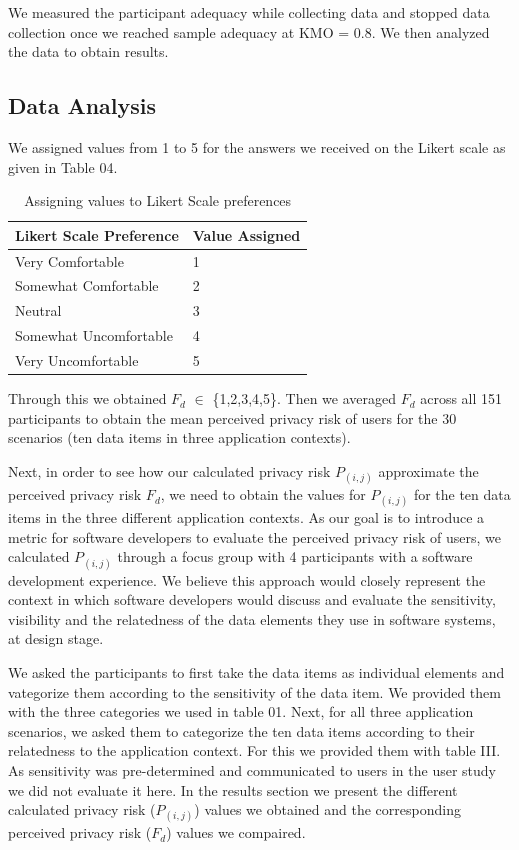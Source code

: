 \documentclass[conference]{IEEEtran}
\begin{document}
We measured the participant adequacy while collecting data and stopped data collection once we reached sample adequacy at KMO = 0.8. We then analyzed the data to obtain results.

\subsection {Data Analysis}

We assigned values from 1 to 5 for the answers we received on the Likert scale as given in Table 04.

\begin{center}
\begin{table}[htbp]
\caption{Assigning values to Likert Scale preferences}
\begin{center}
\begin{tabular}{|l|l|} 
\hline
Likert Scale Preference & Value Assigned \\
\hline
Very Comfortable & 1\\
\hline
Somewhat Comfortable& 2 \\
\hline
Neutral & 3  \\
\hline
Somewhat Uncomfortable & 4 \\
\hline
Very Uncomfortable & 5 \\
\hline
\end{tabular}
\end{center}
\end{table}
\end{center}

Through this we obtained $F_d$ $\in$ \{1,2,3,4,5\}. Then we averaged $F_d$ across all 151 participants to obtain the mean perceived privacy risk of users for the 30 scenarios (ten data items in three application contexts).

Next, in order to see how our calculated privacy risk $P_(i,j)$ approximate the perceived privacy risk $F_d$, we need to obtain the values for $P_(i,j)$ for the ten data items in the three different application contexts. As our goal is to introduce a metric for software developers to evaluate the perceived privacy risk of users, we calculated $P_(i,j)$ through a focus group with 4 participants with a software development experience. We believe this approach would closely represent the context in which software developers would discuss and evaluate the sensitivity, visibility and the relatedness of the data elements they use in software systems, at design stage. 

We asked the participants to first take the data items as individual elements and vategorize them according to the sensitivity of the data item. We provided them with the three categories we used in table 01. Next, for all three application scenarios, we asked them to categorize the ten data items according to their relatedness to the application context. For this we provided them with table III. As sensitivity was pre-determined and communicated to users in the user study we did not evaluate it here. In the results section we present the different calculated privacy risk ($P_(i,j)$) values we obtained and the corresponding perceived privacy risk ($F_d$) values we compaired.
\end{document}
